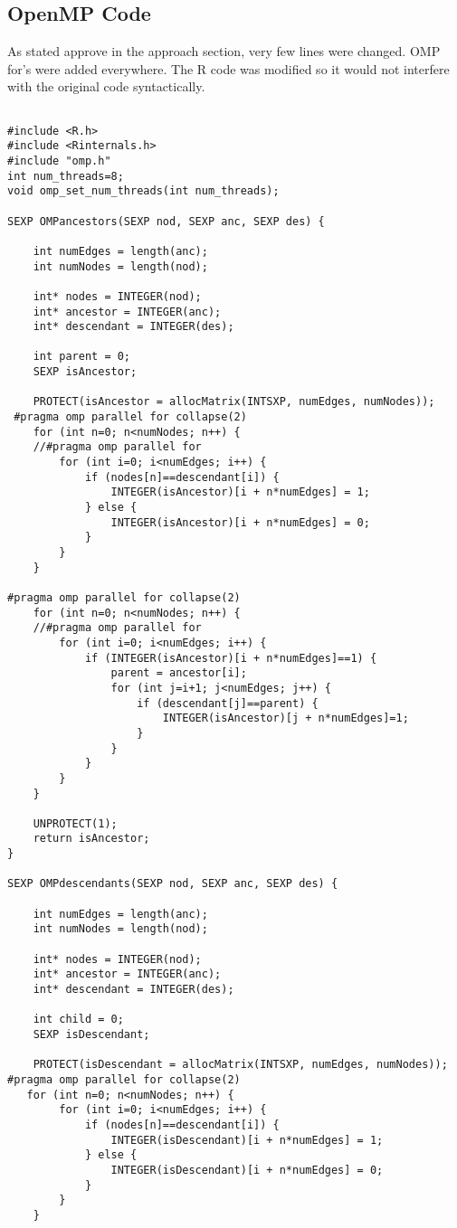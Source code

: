 \documentclass[11pt,letterpaper]{article}
\begin{document}
\subsection{OpenMP Code}

As stated approve in the approach section, very few lines were changed. OMP for's were added everywhere. The R code was modified so it would not interfere with the original code syntactically. 
\begin{lstlisting}[style=MyC++Style]

#include <R.h>
#include <Rinternals.h>
#include "omp.h"
int num_threads=8;
void omp_set_num_threads(int num_threads);

SEXP OMPancestors(SEXP nod, SEXP anc, SEXP des) {

    int numEdges = length(anc);
    int numNodes = length(nod);

    int* nodes = INTEGER(nod);
    int* ancestor = INTEGER(anc);
    int* descendant = INTEGER(des);

    int parent = 0;
    SEXP isAncestor;

    PROTECT(isAncestor = allocMatrix(INTSXP, numEdges, numNodes));
 #pragma omp parallel for collapse(2)
    for (int n=0; n<numNodes; n++) {
	//#pragma omp parallel for
        for (int i=0; i<numEdges; i++) {
            if (nodes[n]==descendant[i]) {
                INTEGER(isAncestor)[i + n*numEdges] = 1;
            } else {
                INTEGER(isAncestor)[i + n*numEdges] = 0;
            }
        }
    }

#pragma omp parallel for collapse(2)
    for (int n=0; n<numNodes; n++) {
	//#pragma omp parallel for
        for (int i=0; i<numEdges; i++) {
            if (INTEGER(isAncestor)[i + n*numEdges]==1) {
                parent = ancestor[i];
                for (int j=i+1; j<numEdges; j++) {
                    if (descendant[j]==parent) {
                        INTEGER(isAncestor)[j + n*numEdges]=1; 
                    }
                }
            }
        }
    }

    UNPROTECT(1);
    return isAncestor;
}

SEXP OMPdescendants(SEXP nod, SEXP anc, SEXP des) {

    int numEdges = length(anc);
    int numNodes = length(nod);

    int* nodes = INTEGER(nod);
    int* ancestor = INTEGER(anc);
    int* descendant = INTEGER(des);

    int child = 0;
    SEXP isDescendant;

    PROTECT(isDescendant = allocMatrix(INTSXP, numEdges, numNodes));
#pragma omp parallel for collapse(2) 
   for (int n=0; n<numNodes; n++) {
        for (int i=0; i<numEdges; i++) {
            if (nodes[n]==descendant[i]) {
                INTEGER(isDescendant)[i + n*numEdges] = 1;
            } else {
                INTEGER(isDescendant)[i + n*numEdges] = 0;
            }
        }
    }


\end{lstlisting}
\end{document}
